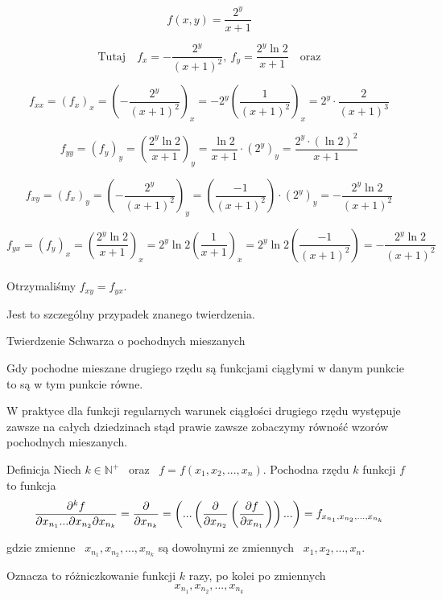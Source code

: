 \begin{przyklad}

$$ f(x,y) = \frac{2^y}{x+1} $$

$$ \textrm{Tutaj} \quad  f_x = -\frac{2^y}{(x+1)^2}, \ f_y = \frac{2^y \ln 2}{x+1} \quad \textrm{oraz} $$

$$ f_{xx} = (f_x)_x = \left( - \frac{2^y}{(x+1)^2} \right)_x = -2^y \left( \frac{1}{(x+1)^2} \right)_x = 2^y \cdot \frac{2}{(x+1)^3} $$

$$ f_{yy} = (f_y)_y = \left( \frac{2^y \ln 2}{x+1} \right)_y = \frac{\ln2}{x+1} \cdot (2^y)_y = \frac{2^y \cdot (\ln2)^2}{x+1} $$

$$ f_{xy} = (f_x)_y = \left( - \frac{2^y}{(x+1)^2} \right)_y = \left( \frac{-1}{(x+1)^2} \right) \cdot (2^y)_y = - \frac{2^y \ln2}{(x+1)^2} $$

$$ f_{yx} = (f_y)_x = \left( \frac{2^y \ln2}{x+1} \right)_x = 2^y \ln2 \left( \frac{1}{x+1} \right)_x = 2^y \ln2 \left( \frac{-1}{(x+1)^2} \right) = - \frac{2^y \ln2}{(x+1)^2} $$ \\

Otrzymaliśmy $ f_{xy} = f_{yx} $.

Jest to szczególny przypadek znanego twierdzenia.
\end{przyklad}

\begin{tw}{Twierdzenie Schwarza o pochodnych mieszanych}

Gdy pochodne mieszane drugiego rzędu są funkcjami ciągłymi w danym punkcie to są w tym punkcie równe.

W praktyce dla funkcji regularnych warunek ciągłości drugiego rzędu występuje zawsze na całych dziedzinach
stąd prawie zawsze zobaczymy równość wzorów pochodnych mieszanych.
\end{tw}

\begin{tw}{Definicja}
Niech $k \in \mathbb{N}^+$ \ oraz \ $ f = f(x_1, x_2, ..., x_n) $. Pochodna rzędu $k$ funkcji $f$ to funkcja
\[ \frac{\partial^k f}{\partial x_{n_1}... \partial x_{n_2} \partial x_{n_k}} = \frac{\partial }{\partial x_{n_k}}
= \left( ... \left( \frac{\partial }{\partial x_{n_2}} \left( \frac{\partial f}{\partial x_{n_1}} \right) \right) ... \right) = f_{x_{n_1}, x_{n_2}, ..., x_{n_k}} \]

gdzie zmienne \ $ x_{n_1}, x_{n_2}, ..., x_{n_k} $ są dowolnymi ze zmiennych \ $x_1, x_2, ..., x_n$. \bigskip

Oznacza to różniczkowanie funkcji $k$ razy, po kolei po zmiennych
\[ x_{n_1}, x_{n_2}, ..., x_{n_k} \]

\end{tw}

